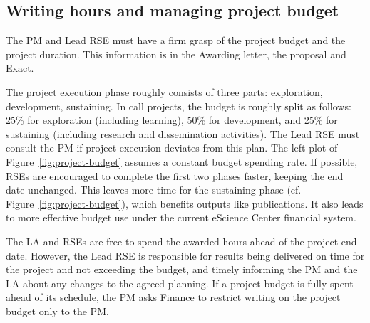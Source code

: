 \subsection{Writing hours and managing project budget}
\label{sec:exec:budget}
The PM and Lead RSE must have a firm grasp of the project budget and the project duration. This information is in the
Awarding letter, the proposal and Exact.

The project execution phase roughly consists of three parts: exploration, development, sustaining.
In call projects, the budget is roughly split as follows: 25\% for 
exploration (including learning), 50\% for development, and 25\% for sustaining (including research
and dissemination activities). The Lead RSE must consult the PM if project execution deviates from this plan. 
%
The left plot of Figure~\ref{fig:project-budget} assumes a constant budget spending rate. If possible, RSEs are encouraged to complete the first two phases faster, 
keeping the end date unchanged. This leaves more time for the sustaining phase (cf. Figure~\ref{fig:project-budget}), which benefits outputs like publications. 
It also leads to more effective budget use under the current eScience Center financial system.


The LA and RSEs are free to spend the awarded hours ahead of the project end date. However, the Lead RSE is responsible 
for results being delivered on time for the project and not exceeding the budget, and timely informing the PM and the LA 
about any changes to the agreed planning. If a project budget is fully spent ahead of its schedule, the PM asks Finance to restrict writing on the
project budget only to the PM.

